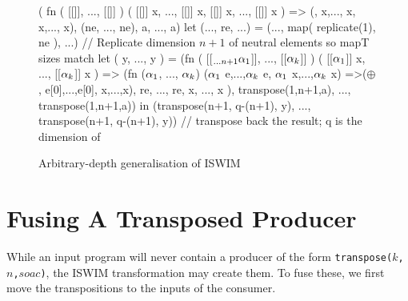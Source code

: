 \begin{figure}[bt]
\begin{colorcode}
( fn ( [[]], ..., [[]] )
          ( [[]] x, ..., [[]] x,
            [[]] x, ..., [[]] x ) =>
                (\mymath{\oplus}, x,..., x, x,..., x),
     (ne, ..., ne), a, ..., a)
             \emphh{\(\equiv\)}
let (..., re, ...) = (..., map( replicate(1), ne ), ...)
// Replicate dimension \(n+1\) of neutral elements so mapT sizes match
let ( y, ..., y ) =
  (fn ( [[\(_{...n+1}\alpha_{1}\)]],    ..., [[\(\alpha_{k}\)]] )
          ( [[\(\alpha_{1}\)]] x, ..., [[\(\alpha_{k}\)]] x ) =>
          (fn (\(\alpha_{1}\),  ..., \(\alpha_{k}\))
                   (\(\alpha_{1}\) e,...,\(\alpha_{k}\) e,
                    \(\alpha_{1}\) x,...,\(\alpha_{k}\) x)
                     =>(\(\oplus\), e[0],...,e[0], x,...,x),
                 re, ..., re, x, ..., x ),
       transpose(1,n+1,a), ..., transpose(1,n+1,a))
in (transpose(n+1, q-(n+1), y), ..., transpose(n+1, q-(n+1), y))
// transpose back the result; q is the dimension of 
\end{colorcode}
\caption{Arbitrary-depth generalisation of ISWIM}
\label{fig:iswim-deep}
\end{figure}

\section{Fusing A Transposed Producer}

While an input program will never contain a producer of the form
\texttt{transpose($k$,$n$,$soac$)}, the ISWIM transformation may
create them.  To fuse these, we first move the transpositions to the
inputs of the consumer.

